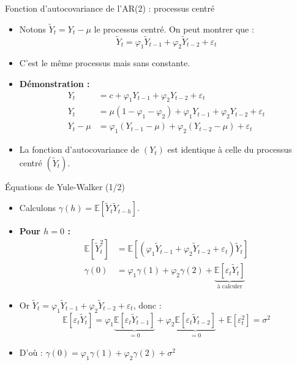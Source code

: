\documentclass[11pt,aspectratio=169]{beamer}
\newcommand{\E}{\mathbb{E}}
\begin{document}
\begin{frame}{Fonction d'autocovariance de l'AR(2) : processus centré}

\begin{itemize}

\item Notons $\tilde{Y}_t = Y_t - \mu$ le processus centré. On peut montrer que :
\[
\tilde{Y}_t = \varphi_1 \tilde{Y}_{t-1} + \varphi_2 \tilde{Y}_{t-2} + \varepsilon_t
\]

\item C'est le même processus mais sans constante.\newline

\item \textbf{Démonstration :}
\begin{align*}
Y_t &= c + \varphi_1 Y_{t-1} + \varphi_2 Y_{t-2} + \varepsilon_t \\
Y_t &= \mu(1 - \varphi_1 - \varphi_2) + \varphi_1 Y_{t-1} + \varphi_2 Y_{t-2} + \varepsilon_t \\
Y_t - \mu &= \varphi_1 (Y_{t-1} - \mu) + \varphi_2 (Y_{t-2} - \mu) + \varepsilon_t
\end{align*}

\item La fonction d'autocovariance de $(Y_t)$ est identique à celle du processus centré $(\tilde{Y}_t)$.

\end{itemize}
\end{frame}

\begin{frame}{Équations de Yule-Walker (1/2)}

\begin{itemize}

\item Calculons $\gamma(h) = \E[\tilde{Y}_t \tilde{Y}_{t-h}]$.\newline

\item \textbf{Pour $h = 0$ :}
\begin{align*}
\E[\tilde{Y}_t^2] &= \E[(\varphi_1 \tilde{Y}_{t-1} + \varphi_2 \tilde{Y}_{t-2} + \varepsilon_t) \tilde{Y}_t] \\
\gamma(0) &= \varphi_1 \gamma(1) + \varphi_2 \gamma(2) + \underbrace{\E[\varepsilon_t \tilde{Y}_t]}_{\text{à calculer}}
\end{align*}

\item Or $\tilde{Y}_t = \varphi_1 \tilde{Y}_{t-1} + \varphi_2 \tilde{Y}_{t-2} + \varepsilon_t$, donc :
\[
\E[\varepsilon_t \tilde{Y}_t] = \varphi_1 \underbrace{\E[\varepsilon_t \tilde{Y}_{t-1}]}_{=0} + \varphi_2 \underbrace{\E[\varepsilon_t \tilde{Y}_{t-2}]}_{=0} + \E[\varepsilon_t^2] = \sigma^2
\]

\item D'où : $\boxed{\gamma(0) = \varphi_1 \gamma(1) + \varphi_2 \gamma(2) + \sigma^2}$

\end{itemize}
\end{frame}
\end{document}
